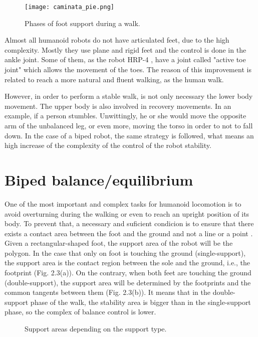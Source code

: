 \begin{figure}[!hbt]
\centering
\texttt{[image: caminata\_pie.png]}
\caption{Phases of foot support during a walk.}
\label{fig:caminata_pie}
\end{figure}

Almost all humanoid robots do not have articulated feet, due to the high complexity. Mostly they use plane and rigid feet and the control is done in the ankle joint. Some of them, as the robot HRP-4 \cite{Kan}, have a joint called "active toe joint" which allows the movement of the toes. The reason of this improvement is related to reach a more natural and fluent walking, as the human walk.

However, in order to perform a stable walk, is not only necessary the lower body movement. The upper body is also involved in recovery movements. In an example, if a person stumbles. Unwittingly, he or she would move the opposite arm of the unbalanced leg, or even more, moving the torso in order to not to fall down. In the case of a biped robot, the same strategy is followed, what means an high increase of the complexity of the control of the robot stability.

\section{Biped balance/equilibrium}
One of the most important and complex tasks for humanoid locomotion is to avoid overturning during the walking or even to reach an upright position of its body. To prevent that, a necessary and suficient condicion is to ensure that there exists a contact area between the foot and the ground and not a line or a point \cite{Vuk}. Given a rectangular-shaped foot, the support area of the robot will be the polygon. In the case that only on foot is touching the ground (single-support), the support area is the contact region between the sole and the ground, i.e., the footprint (Fig. 2.3(a)). On the contrary, when both feet are touching the ground (double-support), the support area will be determined by the footprints and the common tangents between them (Fig. 2.3(b)). It means that in the double-support phase of the walk, the stability area is bigger than in the single-support phase, so the complex of balance control is lower.

\begin{figure}[!hbt]
\centering
{}
\hspace{10mm}
\caption{Support areas depending on the support type.}
\label{fig:apoyo}
\end{figure}


